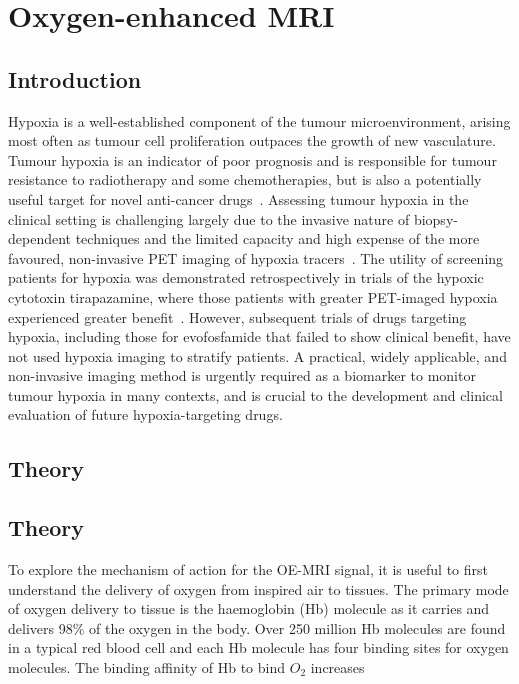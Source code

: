 
\chapter{Oxygen-enhanced MRI}
\label{ch:oemri1}

\section{Introduction}

Hypoxia is a well-established component of the tumour microenvironment, arising most often as tumour cell proliferation outpaces the growth of new vasculature.
Tumour hypoxia is an indicator of poor prognosis and is responsible for tumour resistance to radiotherapy and some chemotherapies, but is also a potentially useful target for novel anti-cancer drugs~\cite{Wilson:2011jp}.
Assessing tumour hypoxia in the clinical setting is challenging largely due to the invasive nature of biopsy-dependent techniques and the limited capacity and high expense of the more favoured, non-invasive PET imaging of hypoxia tracers~\cite{Horsman:2012kw}.
The utility of screening patients for hypoxia was demonstrated retrospectively in trials of the hypoxic cytotoxin tirapazamine, where those patients with greater PET-imaged hypoxia experienced greater benefit~\cite{Rischin:2006fz}.
However, subsequent trials of drugs targeting hypoxia, including those for evofosfamide that failed to show clinical benefit, have not used hypoxia imaging to stratify patients.
A practical, widely applicable, and non-invasive imaging method is urgently required as a biomarker to monitor tumour hypoxia in many contexts, and is crucial to the development and clinical evaluation of future hypoxia-targeting drugs.

\section{Theory}
\section{Theory}
To explore the mechanism of action for the OE-MRI signal, it is useful to first understand the delivery of oxygen from inspired air to tissues. 
The primary mode of oxygen delivery to tissue is the haemoglobin (\acs{Hb}) molecule as it carries and delivers 98\% of the oxygen in the body. 
Over 250 million \acs{Hb} molecules are found in a typical red blood cell and each \acs{Hb} molecule has four binding sites for oxygen molecules. 
The binding affinity of \acs{Hb} to bind ${O_2}$ increases 

